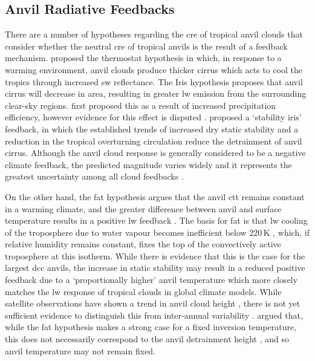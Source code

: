 \subsection{Anvil Radiative Feedbacks}

There are a number of hypotheses regarding the \acrshort{cre} of tropical anvil clouds that consider whether the neutral \acrshort{cre} of tropical anvils is the result of a feedback mechanism. 
\citet{ramanathan_cloud-radiative_1989} proposed the thermostat hypothesis in which, in response to a warming environment, anvil clouds produce thicker cirrus which acts to cool the tropics through increased \acrshort{sw} reflectance. 
The Iris hypothesis proposes that anvil cirrus will decrease in area, resulting in greater \acrshort{lw} emission from the surrounding clear-sky regions.
\citet{lindzen_does_2001} first proposed this as a result of increased precipitation efficiency, however evidence for this effect is disputed \citep{genio_climatic_2002, lin_examination_2004}.
\citet{bony_thermodynamic_2016} proposed a `stability iris' feedback, in which the established trends of increased dry static stability \citep{held_robust_2006} and a reduction in the tropical overturning circulation \citep{vecchi_global_2007} reduce the detrainment of anvil cirrus.
Although the anvil cloud response is generally considered to be a negative climate feedback, the predicted magnitude varies widely and it represents the greatest uncertainty among all cloud feedbacks \citep{sherwood_assessment_2020}.

On the other hand, the \acrfull{fat} hypothesis argues that the anvil \acrfull{ctt} remains constant in a warming climate, and the greater difference between anvil and surface temperature results in a positive \acrshort{lw} feedback \citep{hartmann_important_2002}.
The basis for \acrfull{fat} is that \acrshort{lw} cooling of the troposphere due to water vapour becomes inefficient below 220\,\unit{K} \citep{jeevanjee_simple_2020}, which, if relative humidity remains constant, fixes the top of the convectively active troposphere at this isotherm. 
While there is evidence that this is the case for the largest \acrshort{dcc} anvils, the increase in static stability may result in a reduced positive feedback due to a `proportionally higher' anvil temperature \citep{zelinka_why_2010} which more closely matches the \acrshort{lw} response of tropical clouds in global climate models.
While satellite observations have shown a trend in anvil cloud height \citep{norris_evidence_2016}, there is not yet sufficient evidence to distinguish this from inter-annual variability \citep{takahashi_when_2019}.
\citet{seeley_fat_2019} argued that, while the \acrshort{fat} hypothesis makes a strong case for a fixed inversion temperature, this does not necessarily correspond to the anvil detrainment height \citep{takahashi_level_2017, wang_observational_2020}, and so anvil temperature may not remain fixed.


